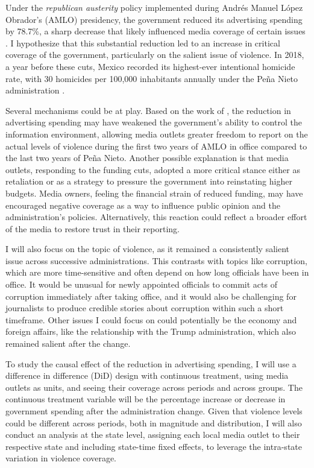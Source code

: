 Under the \textit{republican austerity} policy implemented during Andrés Manuel López Obrador’s (AMLO) presidency, the government reduced its advertising spending by 78.7\%, a sharp decrease that likely influenced media coverage of certain issues \citep{Article19}. I hypothesize that this substantial reduction led to an increase in critical coverage of the government, particularly on the salient issue of violence. In 2018, a year before these cuts, Mexico recorded its highest-ever intentional homicide rate, with 30 homicides per 100,000 inhabitants annually under the Peña Nieto administration \citep{Intentional-Homicides}.

Several mechanisms could be at play. Based on the work of \cite{Censor-Pratt-AER}, the reduction in advertising spending may have weakened the government’s ability to control the information environment, allowing media outlets greater freedom to report on the actual levels of violence during the first two years of AMLO in office compared to the last two years of Peña Nieto. Another possible explanation is that media outlets, responding to the funding cuts, adopted a more critical stance either as retaliation or as a strategy to pressure the government into reinstating higher budgets. Media owners, feeling the financial strain of reduced funding, may have encouraged negative coverage as a way to influence public opinion and the administration’s policies. Alternatively, this reaction could reflect a broader effort of the media to restore trust in their reporting.

I will also focus on the topic of violence, as it remained a consistently salient issue across successive administrations. This contrasts with topics like corruption, which are more time-sensitive and often depend on how long officials have been in office. It would be unusual for newly appointed officials to commit acts of corruption immediately after taking office, and it would also be challenging for journalists to produce credible stories about corruption within such a short timeframe. Other issues I could focus on could potentially be the economy and foreign affairs, like the relationship with the Trump administration, which also remained salient after the change.

To study the causal effect of the reduction in advertising spending, I will use a difference in difference (DiD) design with continuous treatment, using media outlets as units, and seeing their coverage across periods and across groups. The continuous treatment variable will be the percentage increase or decrease in government spending after the administration change. Given that violence levels could be different across periods, both in magnitude and distribution, I will also conduct an analysis at the state level, assigning each local media outlet to their respective state and including state-time fixed effects, to leverage the intra-state variation in violence coverage.

